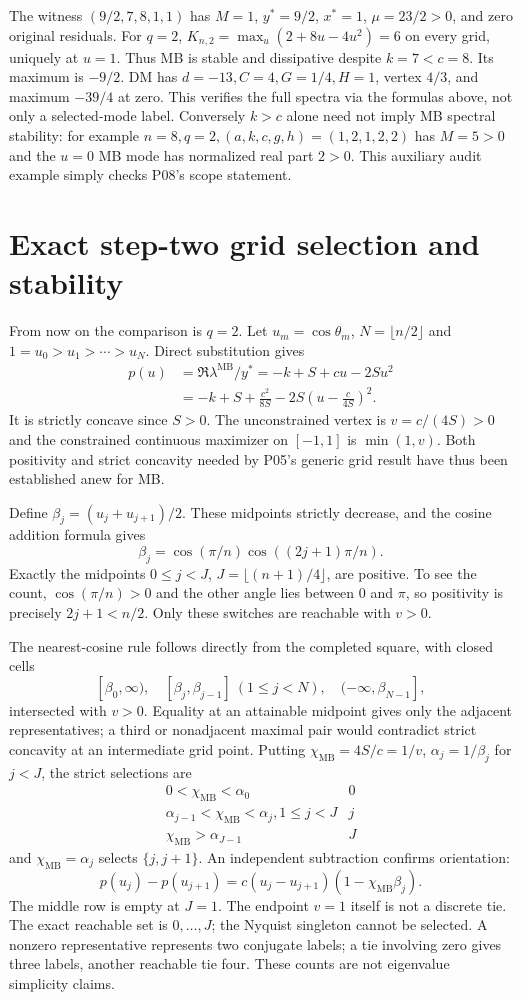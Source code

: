 \documentclass[11pt]{article}
\newcommand{\MB}{\mathrm{MB}}
\begin{document}
The witness $(9/2,7,8,1,1)$ has $M=1$, $y^*=9/2$, $x^*=1$,
$\mu=23/2>0$, and zero original residuals. For $q=2$,
$K_{n,2}=\max_u(2+8u-4u^2)=6$ on every grid, uniquely at $u=1$.
Thus MB is stable and dissipative despite $k=7<c=8$. Its maximum is
$-9/2$. DM has $d=-13,C=4,G=1/4,H=1$, vertex $4/3$, and maximum
$-39/4$ at zero. This verifies the full spectra via the formulas above,
not only a selected-mode label. Conversely $k>c$ alone need not imply
MB spectral stability: for example $n=8,q=2,(a,k,c,g,h)=(1,2,1,2,2)$
has $M=5>0$ and the $u=0$ MB mode has normalized real part $2>0$.
This auxiliary audit example simply checks P08's scope statement.

\section{Exact step-two grid selection and stability}
From now on the comparison is $q=2$. Let
$u_m=\cos\theta_m$, $N=\lfloor n/2\rfloor$ and
$1=u_0>u_1>\cdots>u_N$. Direct substitution gives
\begin{align*}
 p(u)&=\Re\lambda^{\MB}/y^*=-k+S+cu-2Su^2\\
     &=-k+S+\frac{c^2}{8S}-2S\left(u-\frac{c}{4S}\right)^2.
\end{align*}
It is strictly concave since $S>0$. The unconstrained vertex is
$v=c/(4S)>0$ and the constrained continuous maximizer on $[-1,1]$
is $\min(1,v)$. Both positivity and strict concavity needed by P05's
generic grid result have thus been established anew for MB.

Define $\beta_j=(u_j+u_{j+1})/2$. These midpoints strictly decrease,
and the cosine addition formula gives
\[
 \beta_j=\cos(\pi/n)\cos((2j+1)\pi/n).
\]
Exactly the midpoints $0\le j<J$, $J=\lfloor(n+1)/4\rfloor$, are
positive. To see the count, $\cos(\pi/n)>0$ and the other angle lies
between $0$ and $\pi$, so positivity is precisely $2j+1<n/2$.
Only these switches are reachable with $v>0$.

The nearest-cosine rule follows directly from the completed square,
with closed cells
\[
 [\beta_0,\infty),\quad [\beta_j,\beta_{j-1}]\ (1\le j<N),
 \quad(-\infty,\beta_{N-1}],
\]
intersected with $v>0$. Equality at an attainable midpoint gives only
the adjacent representatives; a third or nonadjacent maximal pair
would contradict strict concavity at an intermediate grid point.
Putting $\chi_{\MB}=4S/c=1/v$, $\alpha_j=1/\beta_j$ for $j<J$,
the strict selections are
\[
\begin{array}{c|c}
0<\chi_{\MB}<\alpha_0&0\\
\alpha_{j-1}<\chi_{\MB}<\alpha_j, 1\le j<J&j\\
\chi_{\MB}>\alpha_{J-1}&J
\end{array}
\]
and $\chi_{\MB}=\alpha_j$ selects $\{j,j+1\}$. An independent
subtraction confirms orientation:
\[
 p(u_j)-p(u_{j+1})=c(u_j-u_{j+1})(1-\chi_{\MB}\beta_j).
\]
The middle row is empty at $J=1$. The endpoint $v=1$ itself is not
a discrete tie. The exact reachable set is $0,\ldots,J$; the Nyquist
singleton cannot be selected. A nonzero representative represents two
conjugate labels; a tie involving zero gives three labels, another
reachable tie four. These counts are not eigenvalue simplicity claims.
\end{document}
